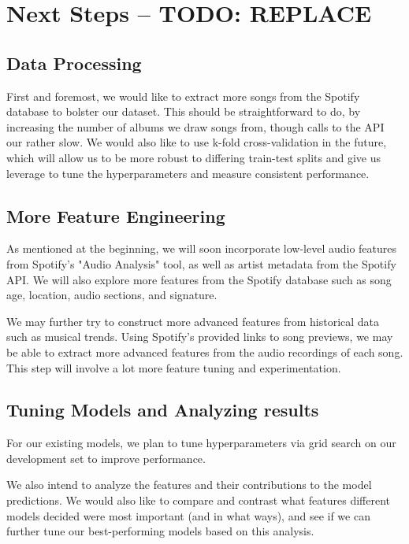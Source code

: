 \documentclass[journal]{IEEEtran}
\begin{document}
\section{Next Steps -- TODO: REPLACE}

\subsection{Data Processing}
First and foremost, we would like to extract more songs from the Spotify database to bolster our dataset. This should be straightforward to do, by increasing the number of albums we draw songs from, though calls to the API our rather slow. We would also like to use k-fold cross-validation in the future, which will allow us to be more robust to differing train-test splits and give us leverage to tune the hyperparameters and measure consistent performance.

\subsection{More Feature Engineering}
As mentioned at the beginning, we will soon incorporate low-level audio features from Spotify's "Audio Analysis" tool, as well as artist metadata from the Spotify API. We will also explore more features from the Spotify database such as song age, location, audio sections, and signature.

We may further try to construct more advanced features from historical data such as musical trends. Using Spotify's provided links to song previews, we may be able to extract more advanced features from the audio recordings of each song. This step will involve a lot more feature tuning and experimentation.

\subsection{Tuning Models and Analyzing results}
For our existing models, we plan to tune hyperparameters via grid search on our development set to improve performance.

We also intend to analyze the features and their contributions to the model predictions. We would also like to compare and contrast what features different models decided were most important (and in what ways), and see if we can further tune our best-performing models based on this analysis.



\end{document}
